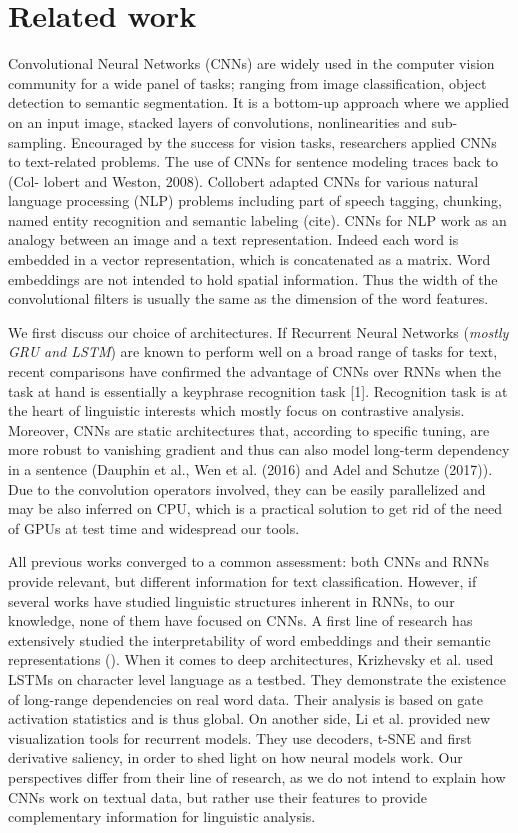 \section{Related work}

Convolutional Neural Networks (CNNs) are widely used in the computer vision community for a wide panel of tasks; ranging from image classification, 
object detection to semantic segmentation. It is a bottom-up approach where we applied on an input image, stacked layers of convolutions, nonlinearities and sub-sampling.
Encouraged by the success for vision tasks, researchers applied CNNs to text-related problems. The use of CNNs for sentence modeling traces back to (Col-
lobert and Weston, 2008). Collobert adapted 
CNNs for various natural language processing (NLP) problems including part of speech tagging, chunking, named entity recognition and semantic labeling (cite). 
CNNs for NLP work as an analogy between an image and a text representation. Indeed each word is embedded in a vector representation, which is concatenated as a matrix. 
Word embeddings are not intended to hold spatial information. Thus the width of the convolutional filters is usually the same as the dimension of the word features.

We first discuss our choice of architectures. 
If Recurrent Neural Networks (\textit{mostly GRU and LSTM}) are known to perform well on a broad range of tasks for text, recent comparisons have confirmed the advantage of CNNs 
over RNNs when the task at hand is essentially a keyphrase recognition task [1]. Recognition task is at the heart of linguistic interests which mostly focus on contrastive analysis.
Moreover, CNNs are static architectures that, according to specific tuning, are more robust 
to vanishing gradient and thus can also model long-term dependency in a sentence (Dauphin et al.,  
Wen et al. (2016) and Adel and Schutze (2017)). Due to the convolution operators involved, 
they can be easily parallelized and may be also inferred on CPU, which is a practical solution to get rid of the need of GPUs at test time and widespread our tools.

 All previous works converged to a common assessment: both CNNs and RNNs provide relevant, but different information for text classification. 
 However, if several works have studied linguistic structures inherent in RNNs, to our knowledge, none of them have focused on CNNs. 
 A first line of research has extensively studied the interpretability of word embeddings and their semantic representations (). 
 When it comes to deep architectures, Krizhevsky et al. used LSTMs on character level language as a testbed. They demonstrate the existence of 
 long-range dependencies on real word data. Their analysis is based on gate activation statistics and is thus global. On another side, Li et al. 
 provided new visualization tools for recurrent models. They use decoders, t-SNE and first derivative saliency, in order to shed light on how neural models work.
Our perspectives differ from their line of research, as we do not intend to explain how CNNs work on textual data, but rather use their features 
to provide complementary information for linguistic analysis.

